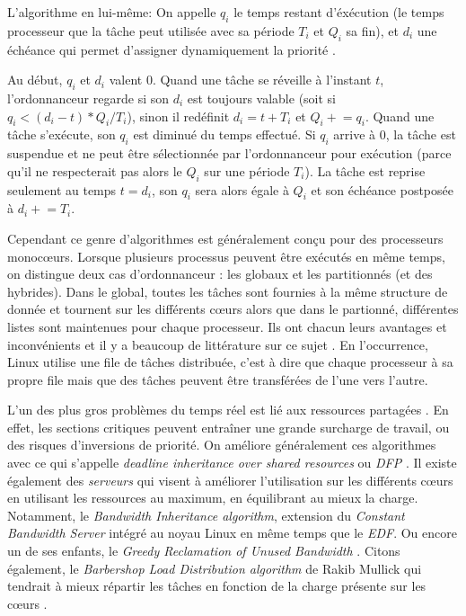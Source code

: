 \documentclass[letterpaper]{article}
\begin{document}
\newcommand{\pluseq}{\mathrel{+}=}

L'algorithme en lui-même:
On appelle \textit{$q_i$} le temps restant d'éxécution (le temps processeur que la tâche peut utilisée avec sa période \textit{$T_i$} et \textit{$Q_i$} sa fin), et \textit{$d_i$} une échéance qui permet d'assigner dynamiquement la priorité \citep{LelliEDFLinux}.

Au début, \textit{$q_i$} et \textit{$d_i$} valent 0.
Quand une tâche se réveille à l'instant $t$, l'ordonnanceur regarde si son $d_i$ est toujours valable (soit si $q_i < (d_i - t) * Q_i/ T_i$), sinon il redéfinit $d_i = t + T_i$ et $Q_i \pluseq q_i$. Quand une tâche s'exécute, son $q_i$ est diminué du temps effectué. Si $q_i$ arrive à 0, la tâche est suspendue et ne peut être sélectionnée par l'ordonnanceur pour exécution (parce qu'il ne respecterait pas alors le $Q_i$ sur une période $T_i$). La tâche est reprise seulement au temps $t = d_i$, son $q_i$ sera alors égale à $Q_i$ et son échéance postposée à $d_i \pluseq T_i$.

Cependant ce genre d'algorithmes est généralement conçu pour des processeurs monocœurs. Lorsque plusieurs processus peuvent être exécutés en même temps, on distingue deux cas d'ordonnanceur \citep{faggioli2009implementation}: les globaux et les partitionnés (et des hybrides). Dans le global, toutes les tâches sont fournies à la même structure de donnée et tournent sur les différents cœurs alors que dans le partionné, différentes listes sont maintenues pour chaque processeur. Ils ont chacun leurs avantages et inconvénients et il y a beaucoup de littérature sur ce sujet \citep{bastoni2010empirical, lelli2012experimental}.
En l'occurrence, Linux utilise une file de tâches distribuée, c'est à dire que chaque processeur à sa propre file mais que des tâches peuvent être transférées de l'une vers l'autre.

L'un des plus gros problèmes du temps réel est lié aux ressources partagées \citep{buttazzo2011hard}. En effet, les sections critiques peuvent entraîner une grande surcharge de travail, ou des risques d'inversions de priorité. On améliore généralement ces algorithmes avec ce qui s'appelle \textit{deadline inheritance over shared resources} ou \textit{DFP} \citep{jansen2003lightweight}. Il existe également des \textit{serveurs} qui visent à améliorer l'utilisation sur les différents cœurs en utilisant les ressources au maximum, en équilibrant au mieux la charge. Notamment, le \textit{Bandwidth Inheritance algorithm}, extension du \textit{Constant Bandwidth Server} \citep{Abeni:1998:IMA:827270.829047} intégré au noyau Linux en même temps que le \textit{EDF}. Ou encore un de ses enfants, le \textit{Greedy Reclamation of Unused Bandwidth} \citep{Lipari:2000:GRU:1947412.1947445}. Citons également, le \textit{Barbershop Load
Distribution algorithm} de Rakib Mullick qui tendrait à mieux répartir les tâches en fonction de la charge présente sur les cœurs \citep{BarbershopLoadDistribution}.
\end{document}
